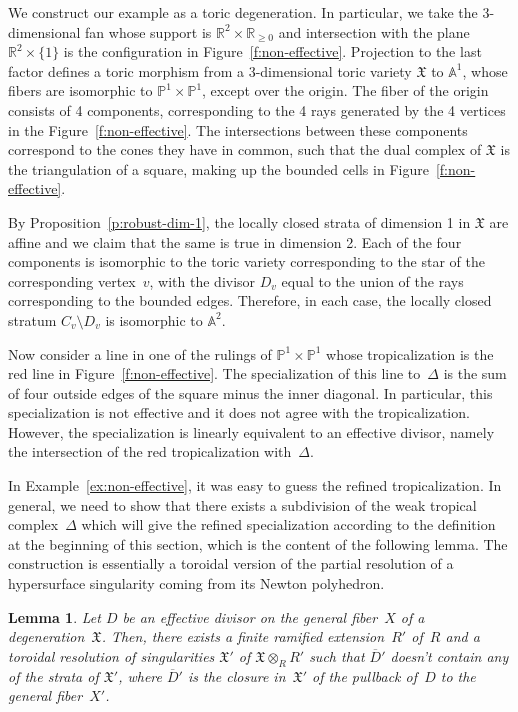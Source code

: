 \documentclass[11pt]{amsart}
\newtheorem{lem}[thm]{Lemma}
\theoremstyle{definition}
\newcommand{\PP}{\mathbb P}
\newcommand{\RR}{\mathbb R}
\newcommand{\X}{\mathfrak X}
\begin{document}
\begin{ex}\label{ex:non-effective}
We construct our example as a toric degeneration. In particular, we take the
3-dimensional fan whose support is $\RR^2 \times \RR_{\geq 0}$ and intersection
with the plane $\RR^2 \times \{1\}$ is the configuration in
Figure~\ref{f:non-effective}. Projection to the last factor defines a toric
morphism from a 3-dimensional toric variety $\X$ to $\mathbb A^1$, whose fibers
are isomorphic to $\PP^1 \times \PP^1$, except over the origin. The fiber of the
origin consists of 4 components, corresponding to the 4 rays generated by the 4
vertices in the Figure~\ref{f:non-effective}. The intersections between these
components correspond to the cones they have in common, such that the dual
complex of $\X$ is the triangulation of a square, making up the bounded cells in
Figure~\ref{f:non-effective}.

By Proposition~\ref{p:robust-dim-1}, the locally closed strata of dimension 1 in
$\X$ are affine and we claim that the same is true in dimension 2. Each of the
four components is isomorphic to the toric variety corresponding to the star of
the corresponding vertex~$v$, with the divisor $D_v$ equal to the union of the
rays corresponding to the bounded edges. Therefore, in each case, the locally
closed stratum $C_v \setminus D_v$ is isomorphic to $\mathbb A^2$.

Now consider a line in one of the rulings of $\PP^1 \times \PP^1$ whose
tropicalization is the red line in Figure~\ref{f:non-effective}. The
specialization of this line to~$\Delta$ is the sum of four outside edges of the
square minus the inner diagonal.  In particular, this specialization is not
effective and it does not agree with the tropicalization. However, the
specialization is linearly equivalent to an effective divisor, namely the
intersection of the red tropicalization with~$\Delta$. 
\end{ex}

In Example~\ref{ex:non-effective}, it was easy to guess the refined
tropicalization. In general, we need to show that there exists a subdivision of
the weak tropical complex~$\Delta$ which will give the refined specialization
according to the definition at the beginning of this section, which is the
content of the following lemma. The construction is essentially a toroidal
version of the partial resolution of a hypersurface singularity coming from its
Newton polyhedron.

\begin{lem}\label{l:fine-effective}
Let $D$ be an effective divisor on the general fiber~$X$ of a
degeneration~$\X$. Then, there exists a finite ramified extension~$R'$ of~$R$
and a toroidal resolution of singularities $\X'$ of $\X \otimes_R R'$ such that
$\overline D'$ doesn't contain any of the strata of $\X'$, where $\overline D'$
is the closure in~$\X'$ of the pullback of~$D$ to the general fiber~$X'$.
\end{lem}
\end{document}
